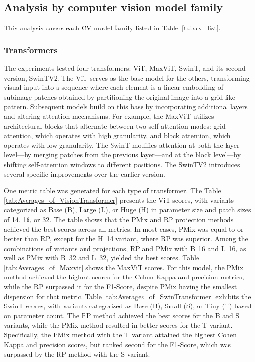 \subsection{Analysis by computer vision model family}
 
This analysis covers each \gls{CV} model family listed in Table~\ref{tab:cv_list}.
 
\subsubsection{Transformers}

The experiments tested four transformers: \gls{ViT}, \gls{MaxViT}, \gls{SwinT}, and its second version, \gls{SwinTV2}. The \gls{ViT} serves as the base model for the others, transforming visual input into a sequence where each element is a linear embedding of subimage patches obtained by partitioning the original image into a grid-like pattern. Subsequent models build on this base by incorporating additional layers and altering attention mechanisms. For example, the \gls{MaxViT} utilizes architectural blocks that alternate between two self-attention modes: grid attention, which operates with high granularity, and block attention, which operates with low granularity. The \gls{SwinT} modifies attention at both the layer level—by merging patches from the previous layer—and at the block level—by shifting self-attention windows to different positions. The \gls{SwinTV2} introduces several specific improvements over the earlier version.


One metric table was generated for each type of transformer.
The Table \ref{tab:Averages_of_VisionTransformer} presents the \gls{ViT} scores, with variants categorized as Base (B), Large (L), or Huge (H) in parameter size and patch sizes of 14, 16, or 32. The table shows that the \gls{PMix} and \gls{RP} projection methods achieved the best scores across all metrics. In most cases, \gls{PMix} was equal to or better than \gls{RP}, except for the \mbox{H 14} variant, where \gls{RP} was superior. Among the combinations of variants and projections, \gls{RP} and \gls{PMix} with \mbox{B 16} and \mbox{L 16}, as well as \gls{PMix} with \mbox{B 32} and \mbox{L 32}, yielded the best scores.
Table \ref{tab:Averages_of_Maxvit} shows the \gls{MaxViT} scores.  For this model, the \gls{PMix} method achieved the highest scores for the Cohen Kappa and precision metrics, while the \gls{RP} surpassed it for the F1-Score, despite \gls{PMix} having the smallest dispersion for that metric.
Table \ref{tab:Averages_of_SwinTransformer} exhibits the \gls{SwinT} scores, with variants categorized as Base (B), Small (S), or Tiny (T) based on parameter count. The \gls{RP} method achieved the best scores for the B and S variants, while the \gls{PMix} method resulted in better scores for the T variant. Specifically, the \gls{PMix} method with the T variant attained the highest Cohen Kappa and precision scores, but ranked second for the F1-Score, which was surpassed by the \gls{RP} method with the S variant.


